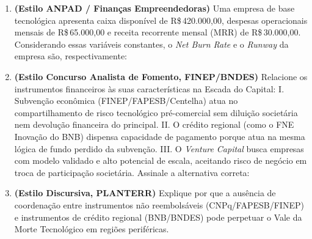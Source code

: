 \begin{enumerate}[leftmargin=1.5em, itemsep=6pt]
  \item \textbf{(Estilo ANPAD / Finanças Empreendedoras)} Uma empresa de base tecnológica apresenta caixa disponível de R\$\,420.000,00, despesas operacionais mensais de R\$\,65.000,00 e receita recorrente mensal (MRR) de R\$\,30.000,00. Considerando essas variáveis constantes, o \textit{Net Burn Rate} e o \textit{Runway} da empresa são, respectivamente:
  \espacoResolucao[1.5cm]

  \item \textbf{(Estilo Concurso Analista de Fomento, FINEP/BNDES)} Relacione os instrumentos financeiros às suas características na Escada do Capital:
  I. Subvenção econômica (FINEP/FAPESB/Centelha) atua no compartilhamento de risco tecnológico pré-comercial sem diluição societária nem devolução financeira do principal.
  II. O crédito regional (como o FNE Inovação do BNB) dispensa capacidade de pagamento porque atua na mesma lógica de fundo perdido da subvenção.
  III. O \textit{Venture Capital} busca empresas com modelo validado e alto potencial de escala, aceitando risco de negócio em troca de participação societária.
  Assinale a alternativa correta:
  \espacoResolucao[1.5cm]

  \item \textbf{(Estilo Discursiva, PLANTERR)} Explique por que a ausência de coordenação entre instrumentos não reembolsáveis (CNPq/FAPESB/FINEP) e instrumentos de crédito regional (BNB/BNDES) pode perpetuar o Vale da Morte Tecnológico em regiões periféricas.
  \espacoResolucao[2.3cm]
\end{enumerate}

